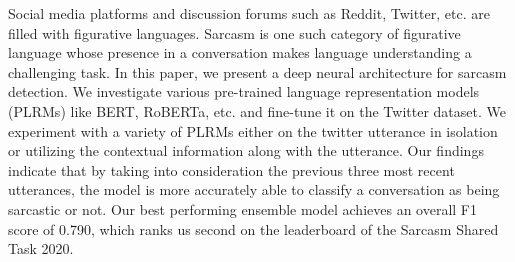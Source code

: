 Social media platforms and discussion forums such as Reddit, Twitter, etc. are filled with figurative languages. Sarcasm is one such category of figurative language whose presence in a conversation makes language understanding a challenging task. In this paper, we present a deep neural architecture for sarcasm detection. We investigate various pre-trained language representation models (PLRMs) like BERT, RoBERTa, etc. and fine-tune it on the Twitter dataset. We experiment with a variety of PLRMs either on the twitter utterance in isolation or utilizing the contextual information along with the utterance. Our findings indicate that by taking into consideration the previous three most recent utterances, the model is more accurately able to classify a conversation as being sarcastic or not. Our best performing ensemble model achieves an overall F1 score of 0.790, which ranks us second on the leaderboard of the Sarcasm Shared Task 2020.
